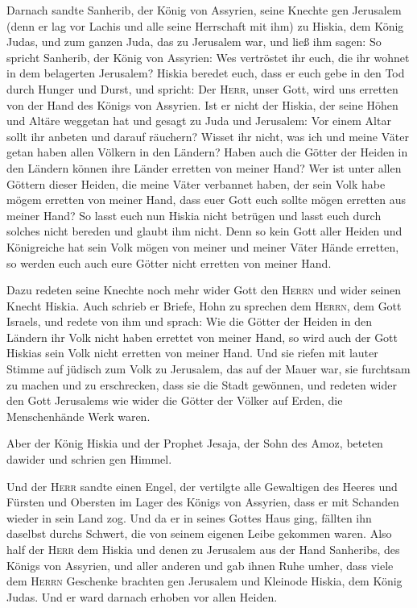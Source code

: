  Darnach sandte Sanherib, der König von Assyrien, seine
Knechte gen Jerusalem (denn er lag vor Lachis und alle seine Herrschaft
mit ihm) zu Hiskia, dem König Judas, und zum ganzen Juda, das zu
Jerusalem war, und ließ ihm sagen:  So spricht Sanherib,
der König von Assyrien: Wes vertröstet ihr euch, die ihr wohnet in dem
belagerten Jerusalem?  Hiskia beredet euch, dass er euch
gebe in den Tod durch Hunger und Durst, und spricht: Der \textsc{Herr},
unser Gott, wird uns erretten von der Hand des Königs von Assyrien.
 Ist er nicht der Hiskia, der seine Höhen und Altäre
weggetan hat und gesagt zu Juda und Jerusalem: Vor einem Altar sollt ihr
anbeten und darauf räuchern?  Wisset ihr nicht, was ich
und meine Väter getan haben allen Völkern in den Ländern? Haben auch die
Götter der Heiden in den Ländern können ihre Länder erretten von meiner
Hand?  Wer ist unter allen Göttern dieser Heiden, die
meine Väter verbannet haben, der sein Volk habe mögem erretten von
meiner Hand, dass euer Gott euch sollte mögen erretten aus meiner Hand?
 So lasst euch nun Hiskia nicht betrügen und lasst euch
durch solches nicht bereden und glaubt ihm nicht. Denn so kein Gott
aller Heiden und Königreiche hat sein Volk mögen von meiner und meiner
Väter Hände erretten, so werden euch auch eure Götter nicht erretten von
meiner Hand.

 Dazu redeten seine Knechte noch mehr wider Gott den
\textsc{Herrn} und wider seinen Knecht Hiskia.  Auch
schrieb er Briefe, Hohn zu sprechen dem \textsc{Herrn}, dem Gott
Israels, und redete von ihm und sprach: Wie die Götter der Heiden in den
Ländern ihr Volk nicht haben errettet von meiner Hand, so wird auch der
Gott Hiskias sein Volk nicht erretten von meiner Hand. 
Und sie riefen mit lauter Stimme auf jüdisch zum Volk zu Jerusalem, das
auf der Mauer war, sie furchtsam zu machen und zu erschrecken, dass sie
die Stadt gewönnen,  und redeten wider den Gott
Jerusalems wie wider die Götter der Völker auf Erden, die Menschenhände
Werk waren.

 Aber der König Hiskia und der Prophet Jesaja, der Sohn
des Amoz, beteten dawider und schrien gen Himmel.

 Und der \textsc{Herr} sandte einen Engel, der vertilgte
alle Gewaltigen des Heeres und Fürsten und Obersten im Lager des Königs
von Assyrien, dass er mit Schanden wieder in sein Land zog. Und da er in
seines Gottes Haus ging, fällten ihn daselbst durchs Schwert, die von
seinem eigenen Leibe gekommen waren.  Also half der
\textsc{Herr} dem Hiskia und denen zu Jerusalem aus der Hand Sanheribs,
des Königs von Assyrien, und aller anderen und gab ihnen Ruhe umher,
 dass viele dem \textsc{Herrn} Geschenke brachten gen
Jerusalem und Kleinode Hiskia, dem König Judas. Und er ward darnach
erhoben vor allen Heiden.

